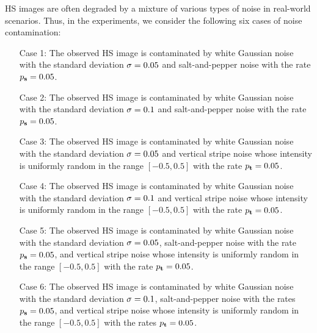 \documentclass[10pt,journal]{IEEEtran}
\begin{document}
HS images are often degraded by a mixture of various types of noise in real-world scenarios.
Thus, in the experiments, we consider the following six cases of noise contamination:
\begin{itemize}
	\setlength{\leftskip}{18pt}
	\item [Case 1:] The observed HS image is contaminated by white Gaussian noise with the standard deviation $\sigma = 0.05$ and salt-and-pepper noise with the rate $p_{\mathbf{s}} = 0.05$.
	\item [Case 2:] The observed HS image is contaminated by white Gaussian noise with the standard deviation $\sigma = 0.1$ and salt-and-pepper noise with the rate $p_{\mathbf{s}} = 0.05$.
 	\item [Case 3:] The observed HS image is contaminated by white Gaussian noise with the standard deviation $\sigma = 0.05$ and vertical stripe noise whose intensity is uniformly random in the range $[-0.5, 0.5]$ with the rate $p_{\mathbf{t}} = 0.05$.
	\item [Case 4:] The observed HS image is contaminated by white Gaussian noise with the standard deviation $\sigma = 0.1$ and vertical stripe noise whose intensity is uniformly random in the range $[-0.5, 0.5]$ with the rate $p_{\mathbf{t}} = 0.05$.
        \item [Case 5:] The observed HS image is contaminated by white Gaussian noise with the standard deviation $\sigma = 0.05$, salt-and-pepper noise with the rate $p_{\mathbf{s}} = 0.05$, and vertical stripe noise whose intensity is uniformly random in the range $[-0.5, 0.5]$ with the rate $p_{\mathbf{t}} = 0.05$.
	\item [Case 6:] The observed HS image is contaminated by white Gaussian noise with the standard deviation $\sigma = 0.1$, salt-and-pepper noise with the rates $p_{\mathbf{s}} = 0.05$, and vertical stripe noise whose intensity is uniformly random in the range $[-0.5, 0.5]$ with the rates $p_{\mathbf{t}} = 0.05$.

\end{itemize}
\end{document}
